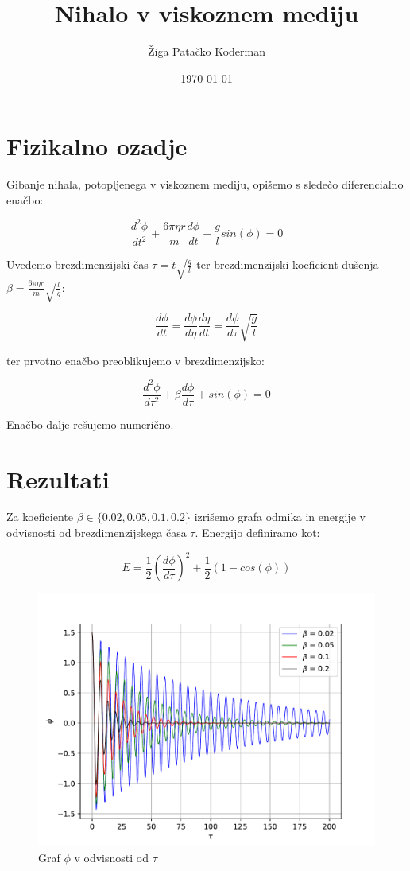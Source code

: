 \documentclass[11pt,a4paper]{article}
\begin{document}
\title{Nihalo v viskoznem mediju}
\author{\v Ziga Pata\v cko Koderman}
\date{\today}

\maketitle

\section{Fizikalno ozadje}

Gibanje nihala, potopljenega v viskoznem mediju, opi\v semo s slede\v co diferencialno ena\v cbo:

$$
\frac{d^2\phi}{dt^2} + \frac{6 \pi \eta r}{m} \frac{d\phi}{dt} + \frac{g}{l}sin(\phi) = 0
$$

Uvedemo brezdimenzijski \v cas $\tau = t\sqrt{\frac{g}{l}}$ ter brezdimenzijski koeficient du\v senja $\beta = \frac{6 \pi \eta r}{m} \sqrt{\frac{l}{g}}$:

$$
\frac{d\phi}{dt} = \frac{d\phi}{d\eta} \frac{d\eta}{dt} = \frac{d\phi}{d\tau} \sqrt{\frac{g}{l}}
$$

ter prvotno ena\v cbo preoblikujemo v brezdimenzijsko:

$$
\frac{d^2\phi}{d\tau ^2} + \beta \frac{d\phi}{d\tau} + sin(\phi) = 0
$$

Ena\v cbo dalje re\v sujemo numeri\v cno.

\section{Rezultati}

Za koeficiente $\beta \in \{ 0.02, 0.05, 0.1, 0.2 \} $ izri\v semo grafa odmika in energije v odvisnosti od brezdimenzijskega \v casa $\tau$. Energijo definiramo kot:

$$
E = \frac{1}{2}(\frac{d\phi}{d\tau})^2 + \frac{1}{2}(1 - cos(\phi))
$$


\begin{figure}
  \begin{center}
  	\includegraphics[width=12cm]{graf1.pdf}
    \caption{Graf $\phi$ v odvisnosti od $\tau$}
  \end{center}
\end{figure}
\end{document}
